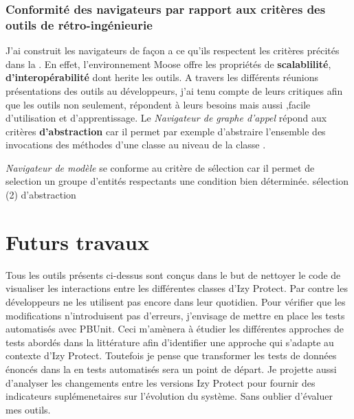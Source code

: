 \documentclass[a4paper]{article}
\begin{document}
 \subsubsection{Conformité des navigateurs par rapport aux critères des outils de rétro-ingénieurie}
J'ai construit les  navigateurs de façon a ce qu'ils respectent les critères précités dans la .
En effet, l'environnement Moose offre les propriétés de \textbf{scalablilité}, \textbf{d'interopérabilité} \cite{Duca05a} dont herite les outils. 
 A travers les différents réunions présentations des outils au développeurs, j'ai tenu compte de leurs critiques  afin que les outils non seulement, répondent à leurs besoins mais aussi ,facile d'utilisation et d'apprentissage.
 Le \textit{Navigateur de graphe d'appel}  répond aux critères  \textbf{d'abstraction} car il permet par exemple d'abstraire l'ensemble des invocations des méthodes d'une classe au niveau de la classe .
 
 \textit{Navigateur de modèle}  se conforme au critère de sélection car il permet de selection un groupe d'entités respectants une condition bien déterminée.
 sélection (2) d'abstraction


\section{Futurs travaux}
\label{sec:roadmap}
Tous les outils présents ci-dessus sont conçus dans le but de nettoyer le code de visualiser les interactions entre les différentes classes d'Izy Protect.
Par contre les développeurs ne les utilisent pas encore dans leur quotidien.
Pour vérifier que  les modifications n'introduisent pas d'erreurs, j'envisage de mettre en place les tests automatisés avec PBUnit. 
Ceci m'amènera à étudier les différentes approches de tests abordés dans la littérature afin d'identifier une approche qui s'adapte au contexte d'Izy Protect. 
Toutefois je pense que transformer les tests de données énoncés dans la  en tests automatisés sera un point de départ. 
Je projette aussi d'analyser  les changements entre les versions Izy Protect pour fournir des indicateurs suplémenetaires sur l'évolution du système.
Sans oublier d'évaluer mes outils. 
\end{document}
